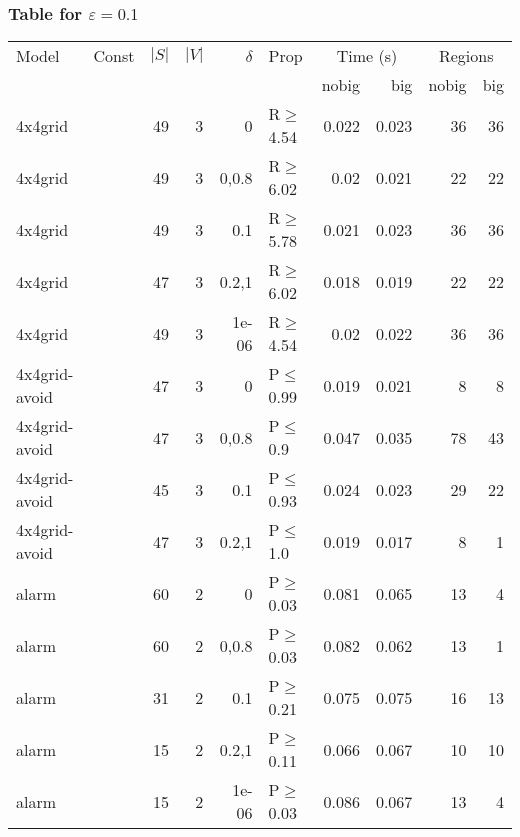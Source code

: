 \subsubsection{Table for \(\varepsilon=0.1\)}
\begin{longtable}{llrrrlrrrr}

        \toprule
        Model & Const & $|S|$ & $|V|$ & $\delta$ & Prop & \multicolumn{2}{c}{Time (s)} & \multicolumn{2}{c}{Regions} \\
        \cmidrule(ll){7-8} \cmidrule(ll){9-10}
        & & & & & & nobig & big & nobig & big \\
        \midrule
        
 4x4grid       &          &     	49 &   3 & 0     & R$\geq$4.54  & 0.022   & 0.023   & 36      & 36   \\
 4x4grid       &          &     	49 &   3 & 0,0.8 & R$\geq$6.02  & 0.02    & 0.021   & 22      & 22   \\
 4x4grid       &          &     	49 &   3 & 0.1   & R$\geq$5.78  & 0.021   & 0.023   & 36      & 36   \\
 4x4grid       &          &     	47 &   3 & 0.2,1 & R$\geq$6.02  & 0.018   & 0.019   & 22      & 22   \\
 4x4grid       &          &     	49 &   3 & 1e-06 & R$\geq$4.54  & 0.02    & 0.022   & 36      & 36   \\
 4x4grid-avoid &          &     	47 &   3 & 0     & P$\leq$0.99  & 0.019   & 0.021   & 8       & 8    \\
 4x4grid-avoid &          &     	47 &   3 & 0,0.8 & P$\leq$0.9   & 0.047   & 0.035   & 78      & 43   \\
 4x4grid-avoid &          &     	45 &   3 & 0.1   & P$\leq$0.93  & 0.024   & 0.023   & 29      & 22   \\
 4x4grid-avoid &          &     	47 &   3 & 0.2,1 & P$\leq$1.0   & 0.019   & 0.017   & 8       & 1    \\
 alarm         &          &     	60 &   2 & 0     & P$\geq$0.03  & 0.081   & 0.065   & 13      & 4    \\
 alarm         &          &     	60 &   2 & 0,0.8 & P$\geq$0.03  & 0.082   & 0.062   & 13      & 1    \\
 alarm         &          &     	31 &   2 & 0.1   & P$\geq$0.21  & 0.075   & 0.075   & 16      & 13   \\
 alarm         &          &     	15 &   2 & 0.2,1 & P$\geq$0.11  & 0.066   & 0.067   & 10      & 10   \\
 alarm         &          &     	15 &   2 & 1e-06 & P$\geq$0.03  & 0.086   & 0.067   & 13      & 4    \\

\end{longtable}
